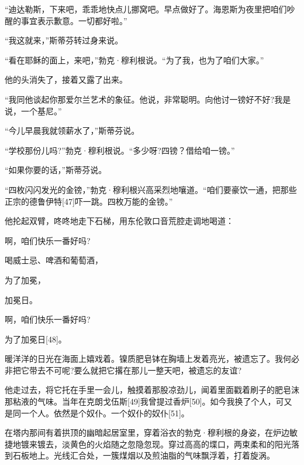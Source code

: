 \documentclass{article}
\begin{document}
“迪达勒斯，下来吧，乖乖地快点儿挪窝吧。早点做好了。海恩斯为夜里把咱们吵醒的事宜表示歉意。一切都好啦。”



“我这就来，”斯蒂芬转过身来说。



“看在耶稣的面上，来吧，”勃克·穆利根说。“为了我，也为了咱们大家。”



他的头消失了，接着又露了出来。



“我同他谈起你那爱尔兰艺术的象征。他说，非常聪明。向他讨一镑好不好?我是说，一个基尼。”



“今儿早晨我就领薪水了，”斯蒂芬说。



“学校那份儿吗?”勃克·穆利根说。“多少呀?四镑？借给咱一镑。”



“如果你要的话，”斯蒂芬说。



“四枚闪闪发光的金镑，”勃克·穆利根兴高采烈地嚷道。“咱们要豪饮一通，把那些正宗的德鲁伊特[47]吓一跳。四枚万能的金镑。”



他抡起双臂，咚咚地走下石梯，用东伦敦口音荒腔走调地喝道：



啊，咱们快乐一番好吗?



喝威士忌、啤酒和葡萄酒，



为了加冕，



加冕日。



啊，咱们快乐一番好吗?



为了加冕日[48]。



暖洋洋的日光在海面上嬉戏着。镍质肥皂钵在胸墙上发着亮光，被遗忘了。我何必非把它带去不可呢?要么就把它撂在那儿一整天吧，被遗忘的友谊?



他走过去，将它托在手里一会儿，触摸着那股凉劲儿，闻着里面戳着刷子的肥皂沫那粘液的气味。当年在克朗戈伍斯[49]我曾提过香炉[50]。如今我换了个人，可又是同一个人。依然是个奴仆。一个奴仆的奴仆[51]。



在塔内那间有着拱顶的幽暗起居室里，穿着浴衣的勃克·穆利根的身姿，在炉边敏捷地镀来镀去，淡黄色的火焰随之忽隐忽现。穿过高高的堞口，两束柔和的阳光落到石板地上。光线汇合处，一簇煤烟以及煎油脂的气味飘浮着，打着旋涡。
\end{document}
